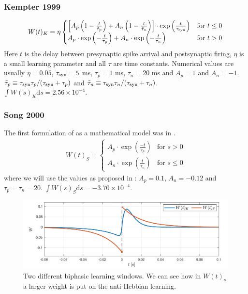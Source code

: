 \subsubsection{Kempter 1999}
\begin{align}
W(t)_K = \eta
\begin{cases}
\left[A_{p}\left(1-\frac{t}{\tilde{\tau}_{p}}\right)+A_{n}\left(1-\frac{t}{\tilde{\tau}_{n}}\right)\right] \cdot \exp \left( \frac{t}{\tau_{\rm syn}} \right) & \text{for } t \leq 0 \\
A_{p} \cdot \exp \left(-\frac{t}{\tau_{p}}\right) + A_{n} \cdot \exp \left(-\frac{t}{\tau_{n}} \right) & \text{for } t > 0
\end{cases} \label{eq:learningwindowKempter1999}
\end{align}
Here $t$ is the delay between presynaptic spike arrival and postsynaptic firing, $\eta$ is a small learning parameter and all $\tau$ are time constants. Numerical values are usually  $\eta = 0.05$, $\tau_{\rm syn} = 5$ ms, $\tau_{p} = 1$ ms, $\tau_{n} = 20$ ms and $A_p = 1$ and $A_{n} = -1$. $\tilde{\tau}_{p} \equiv \tau_{\rm syn} \tau_{p} / (\tau_{\rm syn} + \tau_{p})$ and $\tilde{\tau}_{n} \equiv \tau_{\rm syn} \tau_{n} / (\tau_{\rm syn} + \tau_{n})$. \\
$\int W(s)_K \mathrm{d}s = 2.56 \times 10^{-4}$.


\subsubsection{Song 2000}
The first formulation of \STDP as a mathematical model was in \cite{Song2000}. 
\begin{align}
W(t)_S =
\begin{cases}
A_{p} \cdot \exp \left(\frac{-t}{\tau_p}\right) & \text{for } s > 0 \\
A_{n} \cdot \exp \left(\frac{t}{\tau_n}\right)  & \text{for } s \leq 0
\end{cases} \label{eq:learningwindowKempter1999}
\end{align}
where we will use the values as proposed in \cite{ChrolCannon2012}: $A_p = 0.1$, $A_n = -0.12$ and $\tau_p = \tau_n = 20$. $\int W(s)_S \mathrm{d}s = -3.70 \times 10^{-4}$.

\begin{figure}[H]
\centering
\includegraphics[width = \textwidth]{../Figures/LearningWindowsBiphasic.pdf}
\caption{Two different biphasic learning windows. We can see how in $W(t)_s$ a larger weight is put on the anti-Hebbian learning.}
\label{fig:LearningWindowsBiphasic}
\end{figure}


